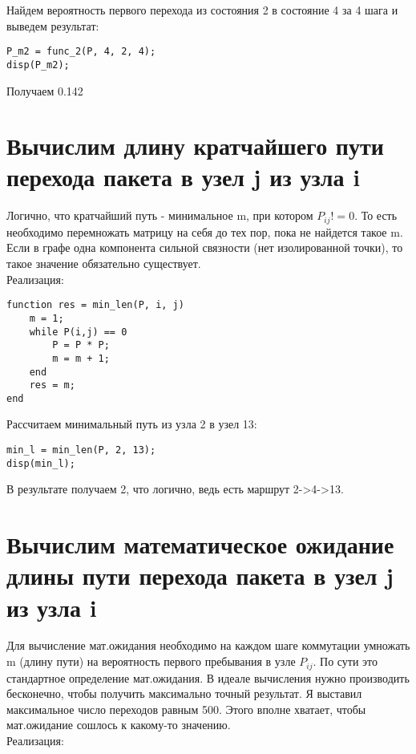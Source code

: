 Найдем вероятность первого перехода из состояния 2 в состояние 4 за 4 шага и выведем результат:

\begin{lstlisting}
P_m2 = func_2(P, 4, 2, 4);
disp(P_m2);
\end{lstlisting}

Получаем 0.142

\section*{\textbf{Вычислим длину кратчайшего пути перехода пакета в узел j из узла i}}

Логично, что кратчайший путь - минимальное m, при котором  $P_{ij} != 0$. То есть необходимо перемножать матрицу на себя до тех
пор, пока не найдется такое m. Если в графе одна компонента сильной связности (нет изолированной точки), то такое значение обязательно
существует. \\

Реализация:


\begin{lstlisting}
function res = min_len(P, i, j)
    m = 1;
    while P(i,j) == 0
        P = P * P; 
        m = m + 1;
    end
    res = m;
end
\end{lstlisting}

Рассчитаем минимальный путь из узла 2 в узел 13:

\begin{lstlisting}
min_l = min_len(P, 2, 13);
disp(min_l);
\end{lstlisting}

В результате получаем 2, что логично, ведь есть маршрут 2->4->13.

\section*{\textbf{Вычислим математическое ожидание длины пути перехода пакета в узел j из узла i}}

Для вычисление мат.ожидания необходимо на каждом шаге коммутации умножать m (длину пути) на вероятность первого пребывания в узле
$P_{ij}$. По сути это стандартное определение мат.ожидания. В идеале вычисления нужно производить бесконечно, чтобы получить
максимально точный результат. Я выставил максимальное число переходов равным 500. Этого вполне хватает, чтобы мат.ожидание сошлось
к какому-то значению. \\

Реализация:

